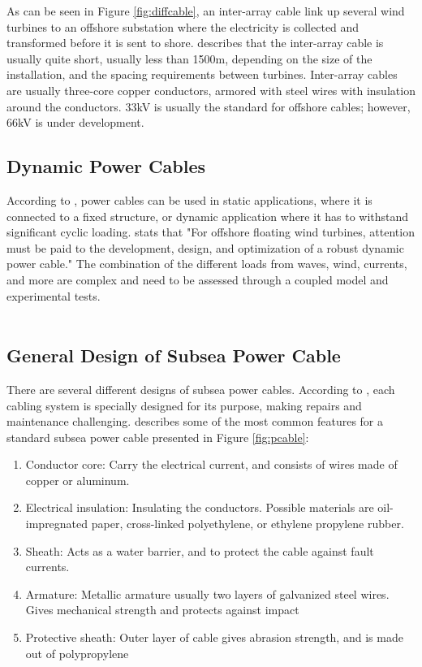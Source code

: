 \noindent As can be seen in Figure \ref{fig:diffcable}, an inter-array cable link up several wind turbines to an offshore substation where the electricity is collected and transformed before it is sent to shore. \cite{srinil2016} describes that the inter-array cable is usually quite short, usually less than 1500m, depending on the size of the installation, and the spacing requirements between turbines. Inter-array cables are usually three-core copper conductors, armored with steel wires with insulation around the conductors. 33kV is usually the standard for offshore cables; however, 66kV is under development. \newline
\newline
  
  \subsection{Dynamic Power Cables}
According to \cite{Thies2012}, power cables can be used in static applications, where it is connected to a fixed structure, or dynamic application where it has to withstand significant cyclic loading. \cite{srinil2016} stats that "For offshore floating wind turbines, attention must be paid to the development, design, and optimization of a robust dynamic power cable." The combination of the different loads from waves, wind, currents, and more are complex and need to be assessed through a coupled model and experimental tests. \\\\
\subsection{General Design of Subsea Power Cable}
There are several different designs of subsea power cables. According to \cite{Beckman}, each cabling system is specially designed for its purpose, making repairs and maintenance challenging. \cite{Thies2012} describes some of the most common features for a standard subsea power cable presented in Figure \ref{fig:pcable}: 

\begin{enumerate}[label=\Alph*]
\item Conductor core: Carry the electrical current, and consists of wires made of copper or aluminum. 
\item Electrical insulation: Insulating the conductors. Possible materials are oil-impregnated paper, cross-linked polyethylene, or ethylene propylene rubber.
\item Sheath: Acts as a water barrier, and to protect the cable against fault currents. 
\item Armature: Metallic armature usually two layers of galvanized steel wires. Gives mechanical strength and protects against impact
\item Protective sheath: Outer layer of cable gives abrasion strength, and is made out of polypropylene
\end{enumerate}

